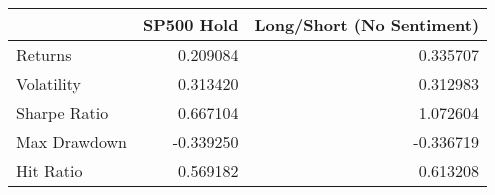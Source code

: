 \begin{tabular}{lrr}
\toprule
{} &  SP500 Hold &  Long/Short (No Sentiment) \\
\midrule
Returns      &    0.209084 &                   0.335707 \\
Volatility   &    0.313420 &                   0.312983 \\
Sharpe Ratio &    0.667104 &                   1.072604 \\
Max Drawdown &   -0.339250 &                  -0.336719 \\
Hit Ratio    &    0.569182 &                   0.613208 \\
\bottomrule
\end{tabular}
